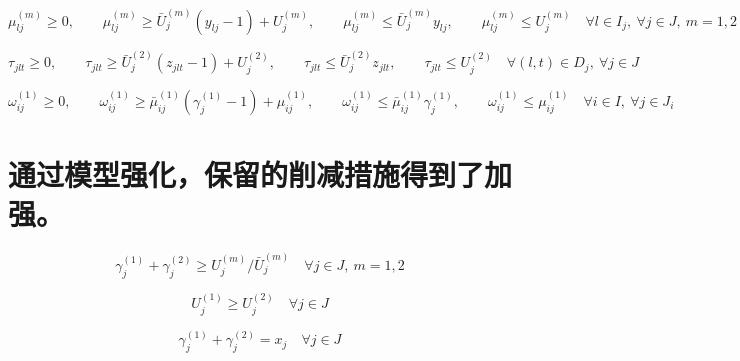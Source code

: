 \documentclass{article}
\begin{document}
\begin{equation}
\mu_{lj}^{(m)} \ge 0,\qquad
\mu_{lj}^{(m)} \ge \bar U_j^{(m)}(y_{lj}-1) + U_j^{(m)},\qquad
\mu_{lj}^{(m)} \le \bar U_j^{(m)} y_{lj},\qquad
\mu_{lj}^{(m)} \le U_j^{(m)}
\quad \forall l \in I_j,\ \forall j \in J,\ m=1,2
\tag{Lin-mu}
\end{equation}

\begin{equation}
\tau_{jlt} \ge 0,\qquad
\tau_{jlt} \ge \bar U_j^{(2)}(z_{jlt}-1) + U_j^{(2)},\qquad
\tau_{jlt} \le \bar U_j^{(2)} z_{jlt},\qquad
\tau_{jlt} \le U_j^{(2)}
\quad \forall (l,t)\in D_j,\ \forall j \in J
\tag{Lin-tau}
\end{equation}

\begin{equation}
\omega_{ij}^{(1)} \ge 0,\qquad
\omega_{ij}^{(1)} \ge \bar\mu_{ij}^{(1)}(\gamma_j^{(1)}-1) + \mu_{ij}^{(1)},\qquad
\omega_{ij}^{(1)} \le \bar\mu_{ij}^{(1)} \gamma_j^{(1)},\qquad
\omega_{ij}^{(1)} \le \mu_{ij}^{(1)}
\quad \forall i \in I,\ \forall j \in J_i
\tag{Lin-omega}
\end{equation}

\section*{通过模型强化，保留的削减措施得到了加强。}
\begin{equation}
\gamma_j^{(1)} + \gamma_j^{(2)} \ge U_j^{(m)} / \bar U_j^{(m)}
\quad \forall j \in J,\ m=1,2
\tag{20}
\end{equation}

\begin{equation}
U_j^{(1)} \ge U_j^{(2)}
\quad \forall j \in J
\tag{21}
\end{equation}

\begin{equation}
\gamma_j^{(1)} + \gamma_j^{(2)} = x_j
\quad \forall j \in J
\tag{22}
\end{equation}
\end{document}
